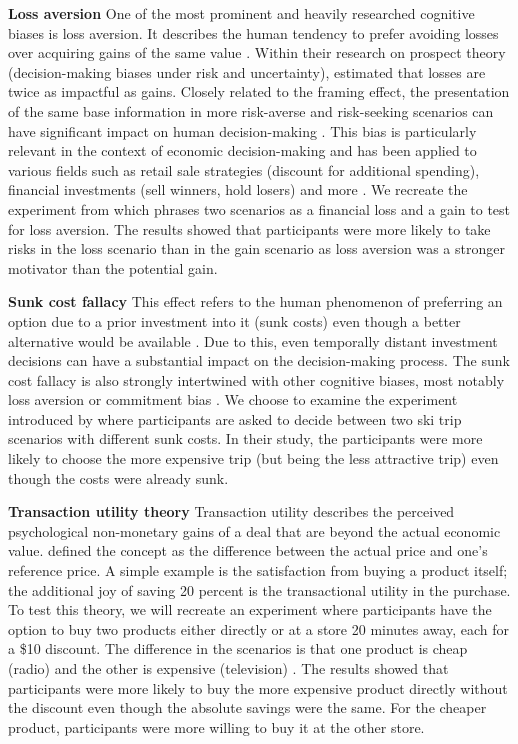 \par \textbf{Loss aversion} One of the most prominent and heavily researched cognitive biases is loss aversion. It describes the human tendency to prefer avoiding losses over acquiring gains of the same value  \parencite{liu2023review}. Within their research on prospect theory (decision-making biases under risk and uncertainty), \textcite{tversky1992advances} estimated that losses are twice as impactful as gains. Closely related to the framing effect, the presentation of the same base information in more risk-averse and risk-seeking scenarios can have significant impact on human decision-making \parencite{druckman2001evaluating}. This bias is particularly relevant in the context of economic decision-making and has been applied to various fields such as retail sale strategies (discount for additional spending), financial investments (sell winners, hold losers) and more \parencite{liu2023review}. We recreate the experiment from \textcite{thaler2015misbehaving} which phrases two scenarios as a financial loss and a gain to test for loss aversion. The results showed that participants were more likely to take risks in the loss scenario than in the gain scenario as loss aversion was a stronger motivator than the potential gain.

\par \textbf{Sunk cost fallacy} This effect refers to the human phenomenon of preferring an option due to a prior investment into it (sunk costs) even though a better alternative would be available \parencite{arkes1985psychology}. Due to this, even temporally distant investment decisions can have a substantial impact on the decision-making process. The sunk cost fallacy is also strongly intertwined with other cognitive biases, most notably loss aversion or commitment bias \parencite{jarmolowicz2016sunk}. We choose to examine the experiment introduced by \textcite{arkes1985psychology} where participants are asked to decide between two ski trip scenarios with different sunk costs. In their study, the participants were more likely to choose the more expensive trip (but being the less attractive trip) even though the costs were already sunk.

\par \textbf{Transaction utility theory} Transaction utility describes the perceived psychological non-monetary gains of a deal that are beyond the actual economic value. \textcite{thaler1983transaction} defined the concept as the difference between the actual price and one's reference price. A simple example is the satisfaction from buying a product itself; the additional joy of saving 20 percent is the transactional utility in the purchase. To test this theory, we will recreate an experiment where participants have the option to buy two products either directly or at a store 20 minutes away, each for a \$10 discount. The difference in the scenarios is that one product is cheap (radio) and the other is expensive (television) \parencite{thaler1983transaction}. The results showed that participants were more likely to buy the more expensive product directly without the discount even though the absolute savings were the same. For the cheaper product, participants were more willing to buy it at the other store.

